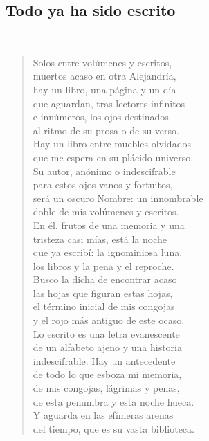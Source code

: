 \documentclass[a4paper, 12pt]{article}
\begin{document}
\pagebreak

\subsection{Todo ya ha sido escrito}
~
\begin{verse}
    
Solos entre volúmenes y escritos,\\
muertos acaso en otra Alejandría,\\
hay un libro, una página y un día\\
que aguardan, tras lectores infinitos\\
e innúmeros, los ojos destinados\\
al ritmo de su prosa o de su verso.\\
Hay un libro entre muebles olvidados\\
que me espera en su plácido universo.\\
Su autor, anónimo o indescifrable\\
para estos ojos vanos y fortuitos,\\
será un oscuro Nombre: un innombrable\\
doble de mis volúmenes y escritos.\\
En él, frutos de una memoria y una\\
tristeza casi mías, está la noche\\
que ya escribí: la ignominiosa luna,\\
los libros y la pena y el reproche.\\
Busco la dicha de encontrar acaso\\
las hojas que figuran estas hojas,\\
el término inicial de mis congojas\\
y el rojo más antiguo de este ocaso.\\
Lo escrito es una letra evanescente\\
de un alfabeto ajeno y una historia\\
indescifrable. Hay un antecedente\\
de todo lo que esboza mi memoria,\\
de mis congojas, lágrimas y penas,\\
de esta penumbra y esta noche hueca.\\
Y aguarda en las efímeras arenas\\
del tiempo, que es su vasta biblioteca.\\
\end{verse}
\end{document}
